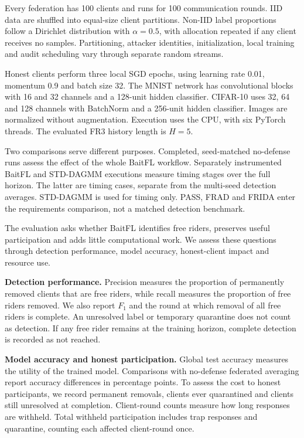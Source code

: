 \documentclass[conference]{IEEEtran}
\makeatletter
\renewcommand{\subsection}{\@startsection{subsection}{2}{\z@}{1.5ex}{0.7ex}{\normalfont\normalsize\itshape}}
\makeatother
\begin{document}
Every federation has 100 clients and runs for 100 communication rounds.
IID data are shuffled into equal-size client partitions. Non-IID label
proportions follow a Dirichlet distribution with $\alpha=0.5$, with
allocation repeated if any client receives no samples. Partitioning,
attacker identities, initialization, local training and audit scheduling
vary through separate random streams.

Honest clients perform three local SGD epochs, using learning rate 0.01,
momentum 0.9 and batch size 32. The MNIST network has convolutional blocks
with 16 and 32 channels and a 128-unit hidden classifier. CIFAR-10 uses
32, 64 and 128 channels with BatchNorm and a 256-unit hidden classifier.
Images are normalized without augmentation. Execution uses the CPU, with
six PyTorch threads. The evaluated FR3 history length is $H=5$.

Two comparisons serve different purposes. Completed, seed-matched
no-defense runs assess the effect of the whole BaitFL workflow.
Separately instrumented BaitFL and STD-DAGMM executions measure timing
stages over the full horizon. The latter are timing cases, separate from
the multi-seed detection averages.
STD-DAGMM is used for timing only. PASS, FRAD and FRIDA enter the
requirements comparison, not a matched detection benchmark.

\begingroup\color{black}
\subsection{Evaluation Metrics}
The evaluation asks whether BaitFL identifies free riders, preserves
useful participation and adds little computational work. We assess these
questions through detection performance, model accuracy, honest-client
impact and resource use.

\textbf{Detection performance.} Precision measures the proportion of
permanently removed clients that are free riders, while recall measures
the proportion of free riders removed. We also report $F_1$ and the round at which removal
of all free riders is complete. An unresolved label or temporary quarantine
does not count as detection. If any free rider remains at the training
horizon, complete detection is recorded as not reached.

\textbf{Model accuracy and honest participation.} Global test accuracy
measures the utility of the trained model. Comparisons with no-defense
federated averaging report accuracy differences in percentage points.
To assess the cost to honest participants, we record permanent removals,
clients ever quarantined and clients still unresolved at completion.
Client-round counts measure how long responses are withheld. Total
withheld participation includes trap responses and quarantine, counting
each affected client-round once.
\end{document}
